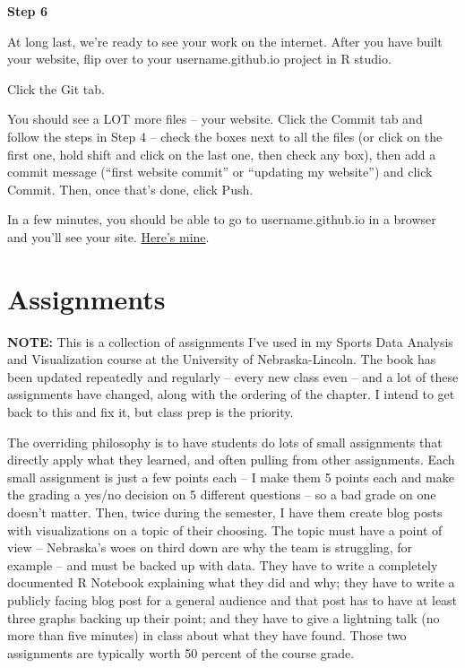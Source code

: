 \documentclass[
]{book}
\begin{document}
\textbf{Step 6}

At long last, we're ready to see your work on the internet. After you have built your website, flip over to your username.github.io project in R studio.

Click the Git tab.

You should see a LOT more files -- your website. Click the Commit tab and follow the steps in Step 4 -- check the boxes next to all the files (or click on the first one, hold shift and click on the last one, then check any box), then add a commit message (``first website commit'' or ``updating my website'') and click Commit. Then, once that's done, click Push.

In a few minutes, you should be able to go to username.github.io in a browser and you'll see your site. \href{http://mattwaite.github.io/}{Here's mine}.

\hypertarget{assignments}{%
\chapter{Assignments}\label{assignments}}

\textbf{NOTE:} This is a collection of assignments I've used in my Sports Data Analysis and Visualization course at the University of Nebraska-Lincoln. The book has been updated repeatedly and regularly -- every new class even -- and a lot of these assignments have changed, along with the ordering of the chapter. I intend to get back to this and fix it, but class prep is the priority.

The overriding philosophy is to have students do lots of small assignments that directly apply what they learned, and often pulling from other assignments. Each small assignment is just a few points each -- I make them 5 points each and make the grading a yes/no decision on 5 different questions -- so a bad grade on one doesn't matter. Then, twice during the semester, I have them create blog posts with visualizations on a topic of their choosing. The topic must have a point of view -- Nebraska's woes on third down are why the team is struggling, for example -- and must be backed up with data. They have to write a completely documented R Notebook explaining what they did and why; they have to write a publicly facing blog post for a general audience and that post has to have at least three graphs backing up their point; and they have to give a lightning talk (no more than five minutes) in class about what they have found. Those two assignments are typically worth 50 percent of the course grade.
\end{document}
